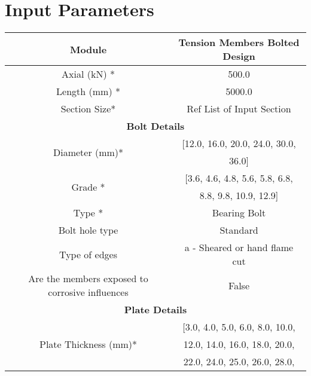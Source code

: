 \documentclass{article}%
\begin{document}
%
\normalsize%
\fontsize{8}{12}%
\selectfont%
\pagestyle{header}%
\section{Input Parameters}%
\label{sec:InputParameters}%
\renewcommand{\arraystretch}{1.2}%
\begin{longtable}{|p{5cm}|p{2cm}|p{2cm}|p{2cm}|p{5cm}|}%
\hline%
\hline%
\multicolumn{3}{|c|}{Module}&\multicolumn{2}{|c|}{Tension Members Bolted Design}\\%
\hline%
\hline%
\multicolumn{3}{|c|}{Axial (kN) *}&\multicolumn{2}{|c|}{500.0}\\%
\hline%
\hline%
\multicolumn{3}{|c|}{Length (mm) *}&\multicolumn{2}{|c|}{5000.0}\\%
\hline%
\hline%
\multicolumn{3}{|c|}{Section Size*}&\multicolumn{2}{|c|}{Ref List of Input Section}\\%
\hline%
\hline%
\multicolumn{5}{|c|}{\textbf{Bolt Details}}\\%
\hline%
\multicolumn{3}{|c|}{\multirow{2}{*}{Diameter (mm)*}}&\multicolumn{2}{|c|}{{[}12.0, 16.0, 20.0, 24.0, 30.0, }\\%
\multicolumn{3}{|c|}{\multirow{2}{*}{}}&\multicolumn{2}{|c|}{36.0{]}}\\%
\hline%
\multicolumn{3}{|c|}{\multirow{2}{*}{Grade *}}&\multicolumn{2}{|c|}{{[}3.6, 4.6, 4.8, 5.6, 5.8, 6.8, }\\%
\multicolumn{3}{|c|}{\multirow{2}{*}{}}&\multicolumn{2}{|c|}{8.8, 9.8, 10.9, 12.9{]}}\\%
\hline%
\hline%
\multicolumn{3}{|c|}{Type *}&\multicolumn{2}{|c|}{Bearing Bolt}\\%
\hline%
\hline%
\multicolumn{3}{|c|}{Bolt hole type}&\multicolumn{2}{|c|}{Standard}\\%
\hline%
\hline%
\multicolumn{3}{|c|}{Type of edges}&\multicolumn{2}{|c|}{a {-} Sheared or hand flame cut}\\%
\hline%
\hline%
\multicolumn{3}{|c|}{Are the members exposed to corrosive influences}&\multicolumn{2}{|c|}{False}\\%
\hline%
\hline%
\multicolumn{5}{|c|}{\textbf{Plate Details}}\\%
\hline%
\multicolumn{3}{|c|}{\multirow{5}{*}{Plate Thickness (mm)*}}&\multicolumn{2}{|c|}{{[}3.0, 4.0, 5.0, 6.0, 8.0, 10.0,}\\%
\multicolumn{3}{|c|}{\multirow{5}{*}{}}&\multicolumn{2}{|c|}{ 12.0, 14.0, 16.0, 18.0, 20.0,}\\%
\multicolumn{3}{|c|}{\multirow{5}{*}{}}&\multicolumn{2}{|c|}{ 22.0, 24.0, 25.0, 26.0, 28.0,}\\%

\end{longtable}
\end{document}

